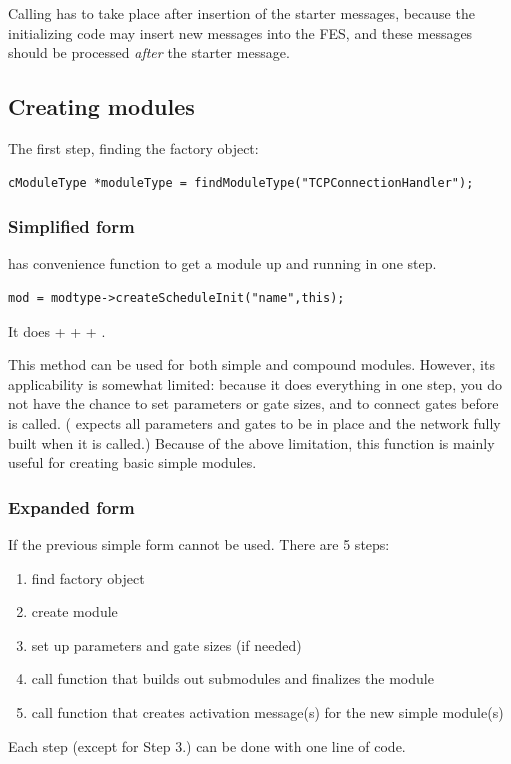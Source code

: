 Calling  has to take place after insertion of the
starter messages, because the initializing code may insert new messages
into the FES, and these messages should be processed
\textit{after} the starter message.

%
%


\subsection{Creating modules}

The first step, finding the factory object:

\begin{verbatim}
cModuleType *moduleType = findModuleType("TCPConnectionHandler");
\end{verbatim}


\subsubsection{Simplified form}

 has
 convenience function to get a module up and
running in one step.

\begin{verbatim}
mod = modtype->createScheduleInit("name",this);
\end{verbatim}

It does  +  +
 + .

This method can be used for both simple and compound modules.
However, its applicability is somewhat limited:
because it does everything in one step,
you do not have the chance to set parameters or gate sizes,
and to connect gates before  is called.
( expects all parameters and gates to
be in place and the network fully built when it is called.)
Because of the above limitation, this function is mainly useful
for creating basic simple modules.

%
%

\subsubsection{Expanded form}


If the previous simple form cannot be used. There are 5 steps:
\begin{enumerate}
  \item{find factory object}
  \item{create module}
  \item{set up parameters and gate sizes (if needed)}
  \item{call function that builds out submodules and finalizes the
    module}
  \item{call function that creates activation message(s) for the new
    simple module(s)}
\end{enumerate}
Each step (except for Step 3.) can be done with one line of code.



